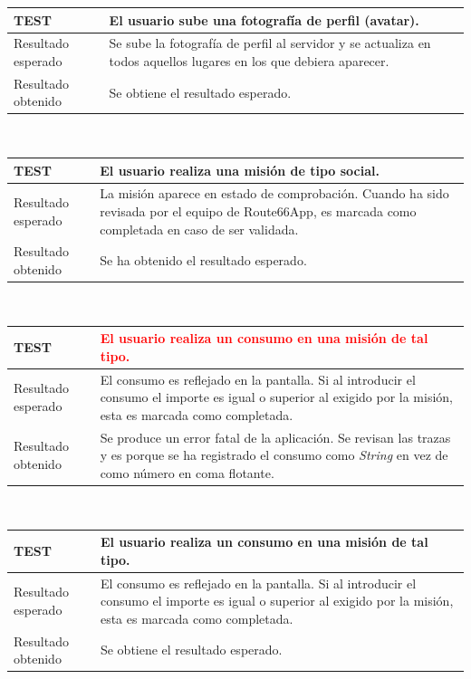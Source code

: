 \documentclass[twoside]{report}
\newcommand\addrow[2]{#1 &#2\\ }
\newcommand\addheading[2]{#1 &#2\\ \hline}
\newcommand\tabularhead{\begin{tabular}{lp{0.7\textwidth}}
\hline
}
\newenvironment{test}{\tabularhead}
{\hline\end{tabular}}
\begin{document}
\vspace{0.5cm}

\begin{test}
  \addheading{\textbf{TEST\arabic{test}}}{El usuario sube una fotografía de perfil (avatar).} 
  \addrow{Resultado esperado}{Se sube la fotografía de perfil al servidor y se actualiza en todos aquellos lugares en los que debiera aparecer.}
   \addrow{Resultado obtenido}{Se obtiene el resultado esperado.}
\end{test}\\

\vspace{0.5cm}


\begin{test}
  \addheading{\textbf{TEST\arabic{test}}}{El usuario realiza una misión de tipo social.} 
  \addrow{Resultado esperado}{La misión aparece en estado de comprobación. Cuando ha sido revisada por el equipo de Route66App, es marcada como completada en caso de ser validada.}
  \addrow{Resultado obtenido}{Se ha obtenido el resultado esperado.}
\end{test}\\

\vspace{0.5cm}

\begin{test}
  \addheading{\textbf{TEST\arabic{test}}}{\textcolor{red}{El usuario realiza un consumo en una misión de tal tipo.}} 
  \addrow{Resultado esperado}{El consumo es reflejado en la pantalla. Si al introducir el consumo el importe es igual o superior al exigido por la misión, esta es marcada como completada.}
  \addrow{Resultado obtenido}{Se produce un error fatal de la aplicación. Se revisan las trazas y es porque se ha registrado el consumo como \textit{String} en vez de como número en coma flotante.}
\end{test}\\

\vspace{0.5cm}

\begin{test}
  \addheading{\textbf{TEST\arabic{test}}}{El usuario realiza un consumo en una misión de tal tipo.} 
  \addrow{Resultado esperado}{El consumo es reflejado en la pantalla. Si al introducir el consumo el importe es igual o superior al exigido por la misión, esta es marcada como completada.}
   \addrow{Resultado obtenido}{Se obtiene el resultado esperado.}
\end{test}\\
\end{document}
